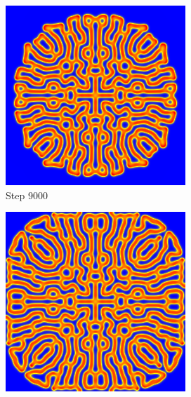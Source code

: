 \documentclass[9pt]{IEEEtran} %
\begin{document}
\begin{figure}[H]
    \begin{subfigure}[b]{0.32\columnwidth}
        \includegraphics[width=\textwidth]{frame_00180.png} %
        \caption{Step 9000} %
        \label{fig:video_d}
    \end{subfigure}
    \hfill
    \begin{subfigure}[b]{0.32\columnwidth}
        \includegraphics[width=\textwidth]{frame_00240.png} %

\end{subfigure}
\end{figure}
\end{document}

